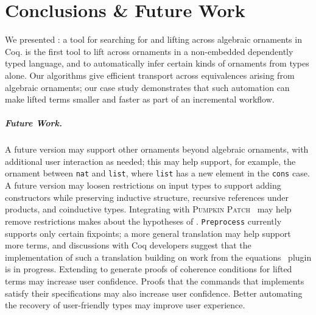 \section{Conclusions \& Future Work}
\label{sec:concl}

We presented \toolnameb: a tool for searching for and lifting across algebraic ornaments in Coq.
\toolnameb is the first tool to lift across ornaments in a non-embedded dependently typed language,
and to automatically infer certain kinds of ornaments from types alone.
Our algorithms give efficient transport across equivalences arising
from algebraic ornaments; our case study demonstrates that such automation can make lifted
terms smaller and faster as part of an incremental workflow.

\subparagraph*{Future Work.} 
A future version may support other ornaments beyond algebraic ornaments,
with additional user interaction as needed; this may help support, for example,
the ornament between \lstinline{nat} and \lstinline{list}, where \lstinline{list}
has a new element in the \lstinline{cons} case.
A future version may loosen restrictions on input types to support
adding constructors while preserving inductive structure, recursive references under products,
and coinductive types. Integrating with \textsc{Pumpkin Patch}~\cite{ringer2018adapting} 
may help remove restrictions \toolnameb makes about the hypotheses of \B.
\lstinline{Preprocess} currently supports only certain fixpoints;
a more general translation may help \toolnameb support more terms, and discussions
with Coq developers suggest that the implementation of such a translation
building on work from the equations~\cite{sozeau:equations} plugin is in progress.
Extending \toolnameb to generate proofs of coherence conditions for lifted terms may increase user confidence.
Proofs that the commands that \toolnameb implements satisfy their specifications may also increase user confidence.
Better automating the recovery of user-friendly types may improve user experience.

